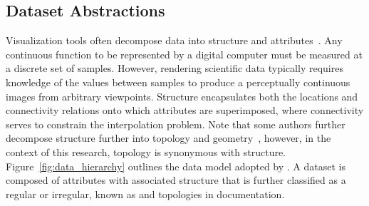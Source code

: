 \subsection{Dataset Abstractions}
Visualization tools often decompose data into structure and
attributes~\cite{vtk}. Any continuous function to be represented by a
digital computer must be measured at a discrete set of
samples. However, rendering scientific data typically requires
knowledge of the values between samples to produce a perceptually
continuous images from arbitrary viewpoints. Structure encapsulates
both the locations and connectivity relations onto which attributes
are superimposed, where connectivity serves to constrain the
interpolation problem. Note that some authors further decompose
structure further into topology and geometry~\cite{weiler}, however,
in the context of this research, topology is synonymous with
structure. Figure~\ref{fig:data_hierarchy} outlines the
data model adopted by \sciwms{}. A dataset is composed of attributes
with associated structure that is further classified as a regular or
irregular, known as \cgrid{} and \ugrid{} topologies in
\sciwms{} documentation.

